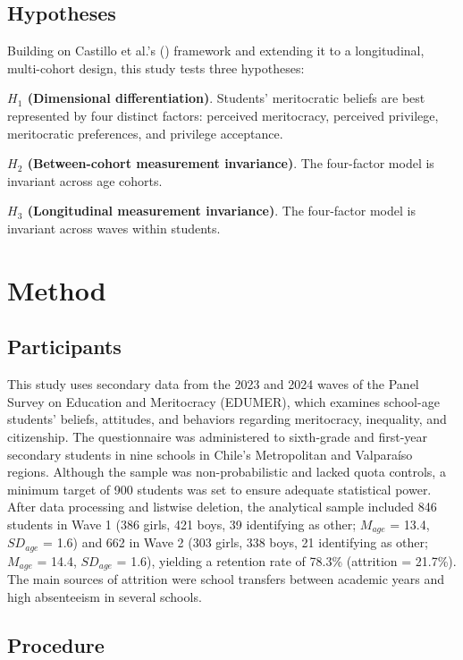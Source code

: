\documentclass[
  13pt,
]{article}
\begin{document}
\subsection{Hypotheses}\label{hypotheses}

Building on Castillo et al.'s
() framework and
extending it to a longitudinal, multi-cohort design, this study tests
three hypotheses:

\textbf{\(H_1\) (Dimensional differentiation)}. Students' meritocratic
beliefs are best represented by four distinct factors: perceived
meritocracy, perceived privilege, meritocratic preferences, and
privilege acceptance.

\textbf{\(H_2\) (Between-cohort measurement invariance)}. The
four-factor model is invariant across age cohorts.

\textbf{\(H_3\) (Longitudinal measurement invariance)}. The four-factor
model is invariant across waves within students.

\section{Method}\label{method}

\subsection{Participants}\label{participants}

This study uses secondary data from the 2023 and 2024 waves of the Panel
Survey on Education and Meritocracy (EDUMER), which examines school-age
students' beliefs, attitudes, and behaviors regarding meritocracy,
inequality, and citizenship. The questionnaire was administered to
sixth-grade and first-year secondary students in nine schools in Chile's
Metropolitan and Valparaíso regions. Although the sample was
non-probabilistic and lacked quota controls, a minimum target of 900
students was set to ensure adequate statistical power. After data
processing and listwise deletion, the analytical sample included 846
students in Wave 1 (386 girls, 421 boys, 39 identifying as other;
\(M_{age}\) = 13.4, \(SD_{age}\) = 1.6) and 662 in Wave 2 (303 girls,
338 boys, 21 identifying as other; \(M_{age}\) = 14.4, \(SD_{age}\) =
1.6), yielding a retention rate of 78.3\% (attrition = 21.7\%). The main
sources of attrition were school transfers between academic years and
high absenteeism in several schools.

\subsection{Procedure}\label{procedure}
\end{document}
